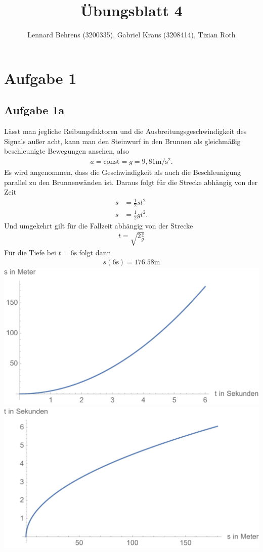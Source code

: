 \documentclass[a4paper,10pt]{extarticle}
\title{Übungsblatt 4}
\author{Lennard Behrens (3200335), Gabriel Kraus (3208414), Tizian Roth}
\begin{document}
\maketitle

\section{Aufgabe 1}
\subsection*{Aufgabe 1a}
Lässt man jegliche Reibungsfaktoren und die Ausbreitungsgeschwindigkeit des Signals außer acht, kann man den Steinwurf in den Brunnen als gleichmäßig beschleunigte Bewegungen ansehen, also
\begin{align*}
  a = \mbox{const} = g = 9,81 \mbox{m}/\mbox{s}^2 \mbox{.}
\end{align*}
Es wird angenommen, dass die Geschwindigkeit als auch die Beschleunigung parallel zu den Brunnenwänden ist. Daraus folgt für die Strecke abhängig von der Zeit
\begin{align*}
  s &= \frac{1}{2}\ddot{s}t^2\\
  s &= \frac{1}{2}gt^2 \mbox{.}
\end{align*}
Und umgekehrt gilt für die Fallzeit abhängig von der Strecke
\begin{align*}
  t = \sqrt{2\frac{s}{g}}
\end{align*}
Für die Tiefe bei $t=6\mbox{s}$ folgt dann
\begin{align*}
  s(6\mbox{s}) = 176.58\mbox{m}
\end{align*}
\includegraphics[scale=0.5]{./Abbildungen/Abbildung_01.pdf}
\includegraphics[scale=0.5]{./Abbildungen/Abbildung_02.pdf}
\end{document}

